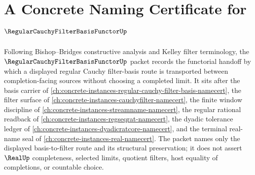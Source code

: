 \chapter{A Concrete Naming Certificate for $\RegularCauchyFilterBasisFunctorUp$}
\label{ch:concrete-instances-regular-cauchy-filter-basis-functor-namecert}

Following Bishop--Bridges constructive analysis and Kelley filter terminology, the $\RegularCauchyFilterBasisFunctorUp$ packet records the functorial handoff by which a displayed regular Cauchy filter-basis route is transported between completion-facing sources without choosing a completed limit. It sits after the basis carrier of \autoref{ch:concrete-instances-regular-cauchy-filter-basis-namecert}, the filter surface of \autoref{ch:concrete-instances-cauchyfilter-namecert}, the finite window discipline of \autoref{ch:concrete-instances-streamname-namecert}, the regular rational readback of \autoref{ch:concrete-instances-regseqrat-namecert}, the dyadic tolerance ledger of \autoref{ch:concrete-instances-dyadicratcore-namecert}, and the terminal real-name seal of \autoref{ch:concrete-instances-real-namecert}. The packet names only the displayed basis-to-filter route and its structural preservation; it does not assert $\RealUp$ completeness, selected limits, quotient filters, host equality of completions, or countable choice.

